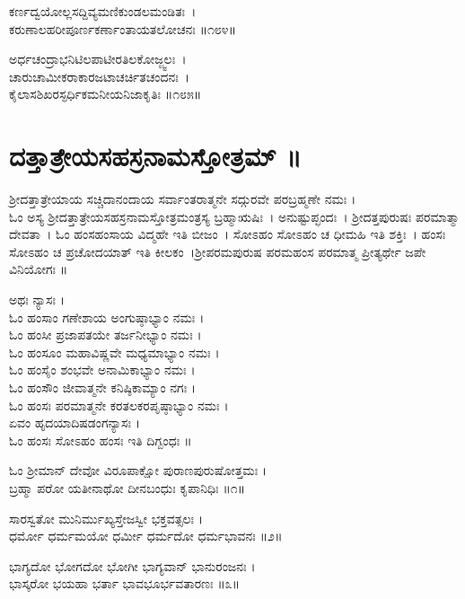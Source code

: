 	ಕರ್ಣದ್ವಯೋಲ್ಲಸದ್ದಿವ್ಯಮಣಿಕುಂಡಲಮಂಡಿತಃ~।\\
	ಕರುಣಾಲಹರೀಪೂರ್ಣಕರ್ಣಾಂತಾಯತಲೋಚನಃ ॥೧೮೪॥

ಅರ್ಧಚಂದ್ರಾಭನಿಟಿಲಪಾಟೀರತಿಲಕೋಜ್ಜ್ವಲಃ~।\\
ಚಾರುಚಾಮೀಕರಾಕಾರಜಟಾಚರ್ಚಿತಚಂದನಃ~।\\
ಕೈಲಾಸಶಿಖರಸ್ಫರ್ಧಿಕಮನೀಯನಿಜಾಕೃತಿಃ ॥೧೮೫॥

\section{ದತ್ತಾತ್ರೇಯಸಹಸ್ರನಾಮಸ್ತೋತ್ರಮ್ ॥}
ಶ್ರೀದತ್ತಾತ್ರೇಯಾಯ ಸಚ್ಚಿದಾನಂದಾಯ ಸರ್ವಾಂತರಾತ್ಮನೇ ಸದ್ಗುರವೇ ಪರಬ್ರಹ್ಮಣೇ ನಮಃ ।\\
ಓಂ ಅಸ್ಯ ಶ್ರೀದತ್ತಾತ್ರೇಯಸಹಸ್ರನಾಮಸ್ತೋತ್ರಮಂತ್ರಸ್ಯ ಬ್ರಹ್ಮಾಋಷಿಃ~। ಅನುಷ್ಟುಪ್ಛಂದಃ~। ಶ್ರೀದತ್ತಪುರುಷಃ ಪರಮಾತ್ಮಾ ದೇವತಾ~। ಓಂ ಹಂಸಹಂಸಾಯ ವಿದ್ಮಹೇ ಇತಿ ಬೀಜಂ~। ಸೋಽಹಂ ಸೋಽಹಂ ಚ ಧೀಮಹಿ ಇತಿ ಶಕ್ತಿಃ~। ಹಂಸಃ ಸೋಽಹಂ ಚ ಪ್ರಚೋದಯಾತ್ ಇತಿ ಕೀಲಕಂ~।ಶ್ರೀಪರಮಪುರುಷ ಪರಮಹಂಸ ಪರಮಾತ್ಮ ಪ್ರೀತ್ಯರ್ಥೇ ಜಪೇ ವಿನಿಯೋಗಃ ॥

ಅಥಃ ನ್ಯಾಸಃ ।\\
ಓಂ ಹಂಸಾಂ ಗಣೇಶಾಯ ಅಂಗುಷ್ಠಾಭ್ಯಾಂ ನಮಃ ।\\
ಓಂ ಹಂಸೀ ಪ್ರಜಾಪತಯೇ ತರ್ಜನೀಭ್ಯಾಂ ನಮಃ ।\\
ಓಂ ಹಂಸೂಂ ಮಹಾವಿಷ್ಣವೇ ಮಧ್ಯಮಾಭ್ಯಾಂ ನಮಃ ।\\
ಓಂ ಹಂಸೈಂ ಶಂಭವೇ ಅನಾಮಿಕಾಭ್ಯಾಂ ನಮಃ ।\\
ಓಂ ಹಂಸೌಂ ಜೀವಾತ್ಮನೇ ಕನಿಷ್ಠಿಕಾಮ್ಯಾಂ ನಗಃ ।\\
ಓಂ ಹಂಸಃ ಪರಮಾತ್ಮನೇ ಕರತಲಕರಪೃಷ್ಠಾಭ್ಯಾಂ ನಮಃ ।\\
ಏವಂ ಹೃದಯಾದಿಷಡಂಗನ್ಯಾಸಃ ।\\
ಓಂ ಹಂಸಃ ಸೋಽಹಂ ಹಂಸಃ ಇತಿ ದಿಗ್ಬಂಧಃ ॥
\newpage
{}

ಓಂ ಶ್ರೀಮಾನ್ ದೇವೋ ವಿರೂಪಾಕ್ಷೋ ಪುರಾಣಪುರುಷೋತ್ತಮಃ ।\\
ಬ್ರಹ್ಮಾ ಪರೋ ಯತೀನಾಥೋ ದೀನಬಂಧುಃ ಕೃಪಾನಿಧಿಃ ॥೧॥

ಸಾರಸ್ವತೋ ಮುನಿರ್ಮುಖ್ಯಸ್ತೇಜಸ್ವೀ ಭಕ್ತವತ್ಸಲಃ ।\\
ಧರ್ಮೋ ಧರ್ಮಮಯೋ ಧರ್ಮೀ ಧರ್ಮದೋ ಧರ್ಮಭಾವನಃ ॥೨॥

ಭಾಗ್ಯದೋ ಭೋಗದೋ ಭೋಗೀ ಭಾಗ್ಯವಾನ್ ಭಾನುರಂಜನಃ ।\\
ಭಾಸ್ಕರೋ ಭಯಹಾ ಭರ್ತಾ ಭಾವಭೂರ್ಭವತಾರಣಃ ॥೩॥

